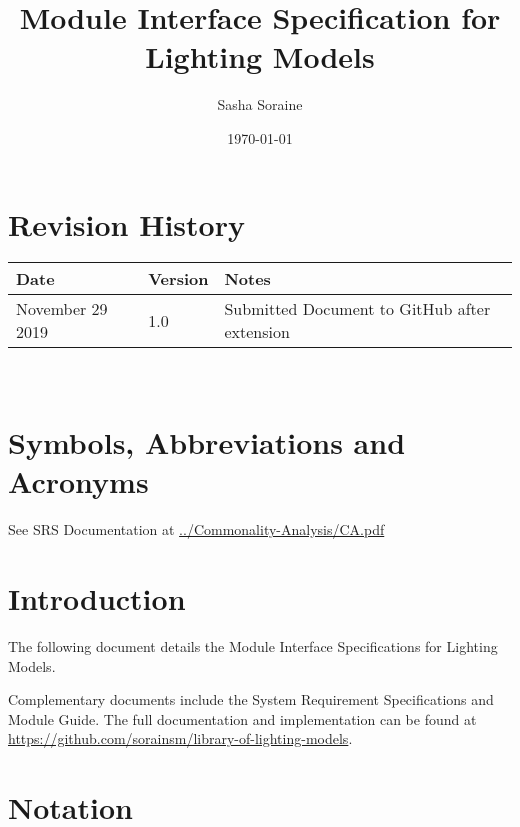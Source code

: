 \documentclass[12pt, titlepage]{article}
\newcommand{\progname}{Lighting Models}
\begin{document}
\title{Module Interface Specification for Lighting Models}

\author{Sasha Soraine}

\date{\today}

\maketitle


\section{Revision History}

\begin{tabularx}{\textwidth}{p{3cm}p{2cm}X}
\toprule {\bf Date} & {\bf Version} & {\bf Notes}\\
\midrule
November 29 2019 & 1.0 & Submitted Document to GitHub after extension\\
\bottomrule
\end{tabularx}

~\newpage

\section{Symbols, Abbreviations and Acronyms}

See SRS Documentation at \url{../Commonality-Analysis/CA.pdf}


\newpage

\tableofcontents

\newpage


\section{Introduction}

The following document details the Module Interface Specifications for
\progname. %

Complementary documents include the System Requirement Specifications
and Module Guide.  The full documentation and implementation can be
found at \url{https://github.com/sorainsm/library-of-lighting-models}.  

\section{Notation}
\end{document}
